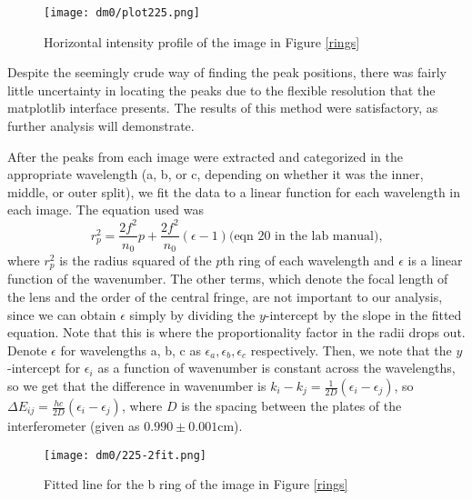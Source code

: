\documentclass{amsart}
\begin{document}
\begin{figure}
\centering
\texttt{[image: dm0/plot225.png]}
\caption{Horizontal intensity profile of the image in Figure \ref{rings}}
\label{peaks}
\end{figure}

Despite the seemingly crude way of finding the peak positions, there was fairly little uncertainty in locating the peaks due to the flexible resolution that the matplotlib interface presents. The results of this method were satisfactory, as further analysis will demonstrate.

After the peaks from each image were extracted and categorized in the appropriate wavelength (a, b, or c, depending on whether it was the inner, middle, or outer split), we fit the data to a linear function for each wavelength in each image. The equation used was 
\begin{equation}
\label{rad_lin}
r_p^2=\frac{2f^2}{n_0}p+\frac{2f^2}{n_0}(\epsilon-1)\text{(eqn 20 {in} the lab manual),}
\end{equation}
where $r_p^2$ is the radius squared of the $p$th ring of each wavelength and $\epsilon$ is a linear function of the wavenumber. The other terms, which denote the focal length of the lens and the order of the central fringe, are not important to our analysis, since we can obtain $\epsilon$ simply by dividing the $y$-intercept by the slope in the fitted equation. Note that this is where the proportionality factor in the radii drops out. Denote $\epsilon$ for wavelengths a, b, c as $\epsilon_a,\epsilon_b,\epsilon_c$ respectively. Then, we note that the $y$-intercept for $\epsilon_i$ as a function of wavenumber is constant across the wavelengths, so we get that the difference in wavenumber is $k_i-k_j=\frac{1}{2D}(\epsilon_i-\epsilon_j)$, so $\Delta E_{ij}=\frac{h c}{2D}(\epsilon_i-\epsilon_j)$, where $D$ is the spacing between the plates of the interferometer (given as $0.990\pm0.001$cm). 

\begin{wrapfigure}{l}{200pt}
\vspace{-15pt}
\centering
\texttt{[image: dm0/225-2fit.png]}
\caption{Fitted line for the b ring of the image in Figure \ref{rings}}
\label{line}
\vspace{-100pt}
\end{wrapfigure}
\end{document}
